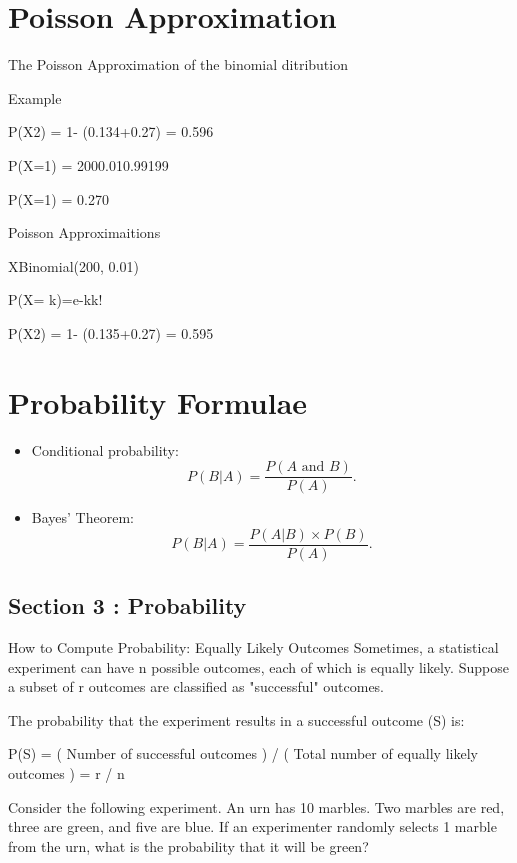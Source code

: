 \documentclass[12pt]{report}
\begin{document}
\section{Poisson Approximation}
The Poisson Approximation of the binomial ditribution

Example

P(X2) = 1- (0.134+0.27) = 0.596

P(X=1) = 2000.010.99199

P(X=1) = 0.270


Poisson Approximaitions


XBinomial(200, 0.01) 


P(X= k)=e-kk!




P(X2) = 1- (0.135+0.27) = 0.595



\section{Probability Formulae}

\begin{itemize}
	
	\item Conditional probability:
	\begin{equation*}
	P(B|A)=\frac{P\left( A\text{ and }B\right) }{P\left( A\right) }.
	\end{equation*}
	
	
	\item Bayes' Theorem:
	\begin{equation*}
	P(B|A)=\frac{P\left(A|B\right) \times P(B) }{P\left( A\right) }.
	\end{equation*}
\end{itemize}
\subsection*{Section 3 : Probability}

How to Compute Probability: Equally Likely Outcomes
Sometimes, a statistical experiment can have n possible outcomes, each of which is equally likely. Suppose a subset of r outcomes are classified as "successful" outcomes.

The probability that the experiment results in a successful outcome (S) is:

P(S) = ( Number of successful outcomes ) / ( Total number of equally likely outcomes ) = r / n

Consider the following experiment. An urn has 10 marbles. Two marbles are red, three are green, and five are blue. If an experimenter randomly selects 1 marble from the urn, what is the probability that it will be green?
\end{document}
